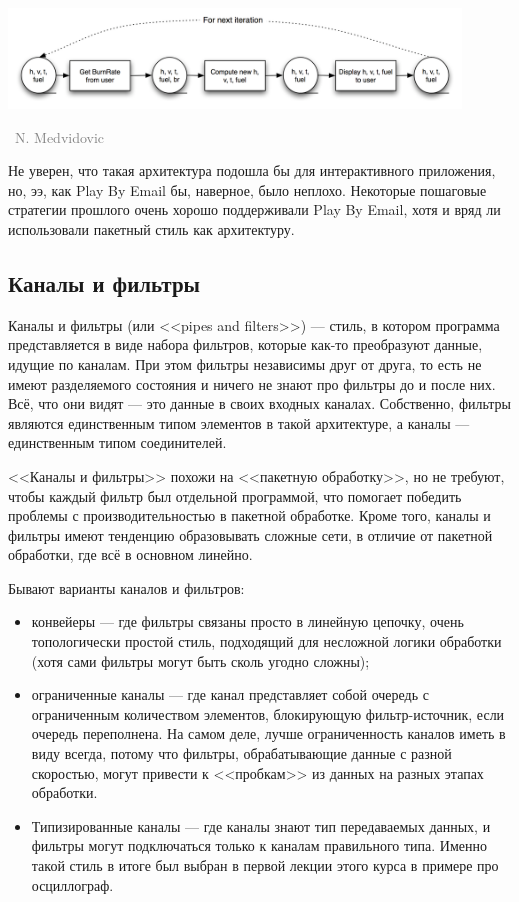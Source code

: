 \documentclass[a5paper]{article}
\newcommand{\attribution}[1] {
    \vspace{-4mm}\begin{flushright}\begin{scriptsize}\textcolor{gray}
    {\textcopyright\, #1}\end{scriptsize}\end{flushright}
}
\begin{document}
\begin{center}
    \includegraphics[width=0.9\textwidth]{batchLL.png}
    \attribution{N. Medvidovic}
\end{center}

Не уверен, что такая архитектура подошла бы для интерактивного приложения, но, ээ, как Play By Email бы, наверное, было неплохо. Некоторые пошаговые стратегии прошлого очень хорошо поддерживали Play By Email, хотя и вряд ли использовали пакетный стиль как архитектуру.

\subsection{Каналы и фильтры}

Каналы и фильтры (или <<pipes and filters>>) --- стиль, в котором программа представляется в виде набора фильтров, которые как-то преобразуют данные, идущие по каналам. При этом фильтры независимы друг от друга, то есть не имеют разделяемого состояния и ничего не знают про фильтры до и после них. Всё, что они видят --- это данные в своих входных каналах. Собственно, фильтры являются единственным типом элементов в такой архитектуре, а каналы --- единственным типом соединителей.

<<Каналы и фильтры>> похожи на <<пакетную обработку>>, но не требуют, чтобы каждый фильтр был отдельной программой, что помогает победить проблемы с производительностью в пакетной обработке. Кроме того, каналы и фильтры имеют тенденцию образовывать сложные сети, в отличие от пакетной обработки, где всё в основном линейно.

Бывают варианты каналов и фильтров:

\begin{itemize}
    \item конвейеры --- где фильтры связаны просто в линейную цепочку, очень топологически простой стиль, подходящий для несложной логики обработки (хотя сами фильтры могут быть сколь угодно сложны);
    \item ограниченные каналы --- где канал представляет собой очередь с ограниченным количеством элементов, блокирующую фильтр-источник, если очередь переполнена. На самом деле, лучше ограниченность каналов иметь в виду всегда, потому что фильтры, обрабатывающие данные с разной скоростью, могут привести к <<пробкам>> из данных на разных этапах обработки.
    \item Типизированные каналы --- где каналы знают тип передаваемых данных, и фильтры могут подключаться только к каналам правильного типа. Именно такой стиль в итоге был выбран в первой лекции этого курса в примере про осциллограф.
\end{itemize}
\end{document}
